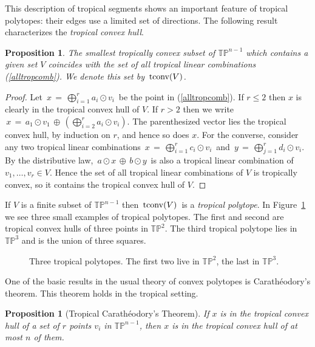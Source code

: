 \documentclass[11pt]{amsart}
\newtheorem{prop}[thm]{Proposition}
\newcommand{\TP}{\mathbb{TP}}
\begin{document}
This description of tropical segments shows an important
feature of tropical polytopes: their edges
use a limited set of directions. The following
result characterizes the \emph{tropical convex hull}.


\begin{prop}\label{tstc}
The smallest tropically convex subset of $\TP^{n-1}$
which contains a given set $V$ coincides with
the set of all tropical linear combinations (\ref{alltropcomb}).
We denote this set by $\, {\rm tconv}(V)$.
\end{prop}

\begin{proof}
Let $\,x\,= \, \bigoplus_{i=1}^r a_i \odot v_i \,$ be
the point in (\ref{alltropcomb}). If $r \leq 2$ then
$x$ is clearly in the tropical convex hull of $V$.
If $r > 2$ then we write
$\, x \, = \, a_1 \odot v_1 \,\oplus \,
 ( \bigoplus_{i=2}^r a_i \odot v_i)$. The parenthesized vector
lies  the tropical convex hull, by induction on $r$,
and hence so does $x$.
For the converse, consider any two tropical linear combinations
$\,x\,= \, \bigoplus_{i=1}^r c_i \odot v_i \,$ and
$\,y\,= \, \bigoplus_{j=1}^r d_i \odot v_i $.
By the distributive law, $\, a \odot x \,\oplus \,b \odot y \,$ is
also a tropical linear combination of $v_1,\ldots,v_r \in V$.
Hence the set of all tropical linear combinations of $V$
is tropically convex, so it contains the
tropical convex hull of $V$.
\end{proof}

If $V$ is a finite subset of $\TP^{n-1}$ then $\, {\rm tconv}(V)\,$
is a  \emph{tropical polytope}. In Figure~\ref{throughex}
we see three small examples of tropical polytopes.
The first and second are tropical convex hulls
of three points in $\TP^2$. The third tropical polytope
lies in $\TP^3$ and is  the union of three squares.

\begin{figure}
 
\caption{\label{throughex}
Three tropical polytopes. The first two live in $\TP^{2}$, the last in $\TP^3$.}
\end{figure}

One of the basic results in the usual theory of convex polytopes
is Carath\'{e}odory's theorem. This theorem holds in the tropical setting.

\begin{prop}[Tropical Carath\'{e}odory's Theorem]\label{carat}
If $x$ is in the tropical convex hull of a set
of $r$ points $v_i$ in $\TP^{n-1}$, then $x$ is in the tropical
convex hull of at most $n$ of them.
\end{prop}
\end{document}
